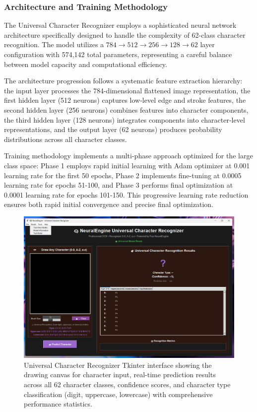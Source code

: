 \documentclass[11pt,a4paper]{report}
\begin{document}
\subsubsection{Architecture and Training Methodology}

The Universal Character Recognizer employs a sophisticated neural network architecture specifically designed to handle the complexity of 62-class character recognition. The model utilizes a $784 \rightarrow 512 \rightarrow 256 \rightarrow 128 \rightarrow 62$ layer configuration with 574,142 total parameters, representing a careful balance between model capacity and computational efficiency.

The architecture progression follows a systematic feature extraction hierarchy: the input layer processes the 784-dimensional flattened image representation, the first hidden layer (512 neurons) captures low-level edge and stroke features, the second hidden layer (256 neurons) combines features into character components, the third hidden layer (128 neurons) integrates components into character-level representations, and the output layer (62 neurons) produces probability distributions across all character classes.

Training methodology implements a multi-phase approach optimized for the large class space: Phase 1 employs rapid initial learning with Adam optimizer at 0.001 learning rate for the first 50 epochs, Phase 2 implements fine-tuning at 0.0005 learning rate for epochs 51-100, and Phase 3 performs final optimization at 0.0001 learning rate for epochs 101-150. This progressive learning rate reduction ensures both rapid initial convergence and precise final optimization.

\begin{figure}[H]
\centering
\includegraphics[width=\textwidth]{universal_character_recognizer_interface.png}
\caption{Universal Character Recognizer Tkinter interface showing the drawing canvas for character input, real-time prediction results across all 62 character classes, confidence scores, and character type classification (digit, uppercase, lowercase) with comprehensive performance statistics.}
\label{fig:universal_interface}
\end{figure}
\end{document}
